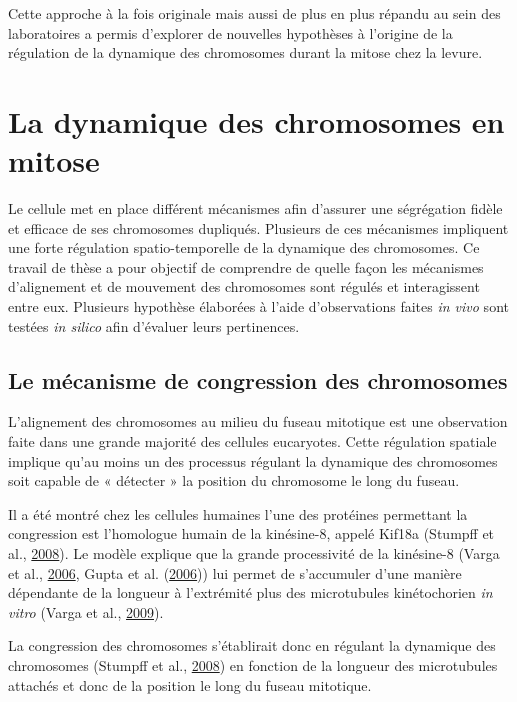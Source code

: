 \documentclass[12pt,a4paper,twoside,openright]{book}
\begin{document}
Cette approche à la fois originale mais aussi de plus en plus répandu au
sein des laboratoires a permis d'explorer de nouvelles hypothèses à
l'origine de la régulation de la dynamique des chromosomes durant la
mitose chez la levure.

\section{La dynamique des chromosomes en
mitose}\label{la-dynamique-des-chromosomes-en-mitose}

Le cellule met en place différent mécanismes afin d'assurer une
ségrégation fidèle et efficace de ses chromosomes dupliqués. Plusieurs
de ces mécanismes impliquent une forte régulation spatio-temporelle de
la dynamique des chromosomes. Ce travail de thèse a pour objectif de
comprendre de quelle façon les mécanismes d'alignement et de mouvement
des chromosomes sont régulés et interagissent entre eux. Plusieurs
hypothèse élaborées à l'aide d'observations faites \emph{in vivo} sont
testées \emph{in silico} afin d'évaluer leurs pertinences.

\subsection{Le mécanisme de congression des
chromosomes}\label{le-muxe9canisme-de-congression-des-chromosomes}

L'alignement des chromosomes au milieu du fuseau mitotique est une
observation faite dans une grande majorité des cellules eucaryotes.
Cette régulation spatiale implique qu'au moins un des processus régulant
la dynamique des chromosomes soit capable de « détecter » la position du
chromosome le long du fuseau.

Il a été montré chez les cellules humaines l'une des protéines
permettant la congression est l'homologue humain de la kinésine-8,
appelé Kif18a (Stumpff et al., \hyperref[ref-Stumpff2008]{2008}). Le
modèle explique que la grande processivité de la kinésine-8 (Varga et
al., \hyperref[ref-Varga2006]{2006}, Gupta et al.
(\hyperref[ref-Gupta2006]{2006})) lui permet de s'accumuler d'une
manière dépendante de la longueur à l'extrémité plus des microtubules
kinétochorien \emph{in vitro} (Varga et al.,
\hyperref[ref-Varga2009]{2009}).

La congression des chromosomes s'établirait donc en régulant la
dynamique des chromosomes (Stumpff et al.,
\hyperref[ref-Stumpff2008]{2008}) en fonction de la longueur des
microtubules attachés et donc de la position le long du fuseau
mitotique.
\end{document}
